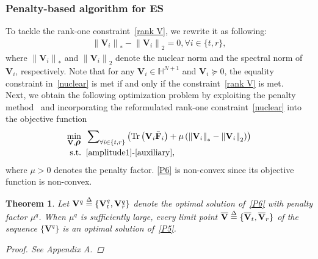 \documentclass[12pt, draftclsnofoot, onecolumn]{IEEEtran}
\DeclareMathOperator{\tr}{Tr}
\newcommand{\bm}[1]{\mbox{\boldmath{$#1$}}}
\newtheorem{theorem}{Theorem}
\begin{document}
\subsubsection{Penalty-based algorithm for ES}
To tackle the rank-one constraint~\eqref{rank V}, we rewrite it as following:
\begin{equation}\label{nuclear}
\begin{aligned}
\left\|{\mathbf{V}}_i\right\|_*-\left\|{\mathbf{V}}_i\right\|_2=0, \forall i\in\{t,r\},
\end{aligned}
\end{equation}
where $\left\|{\mathbf{V}}_i\right\|_*$ and $\left\|{\mathbf{V}}_i\right\|_2$ denote the nuclear norm and the spectral norm of ${\mathbf{V}}_i$, respectively. Note that for any ${\mathbf{V}}_i\in\mathbb{H}^{N+1}$ and ${\mathbf{V}}_i \succeq 0$, the equality constraint in~\eqref{nuclear} is met if and only if the constraint~\eqref{rank V} is met.\\
\indent Next, we obtain the following optimization problem by exploiting the penalty method~\cite{ben1997penalty} and incorporating the reformulated rank-one constraint~\eqref{nuclear} into the objective function
\begin{subequations}\label{P6}
\begin{align}
\label{P6O} \mathop {\min }\limits_{ {{\mathbf{V}},{\bm{\rho}}} } \;\;&\sum\nolimits_{ \forall i \in \{t,r\}}\left(\tr\left({\mathbf{V}}_i\bar{\mathbf{F}}_i\right)+\mu\left(\left\|{\mathbf{V}}_i\right\|_*-\left\|{\mathbf{V}}_i\right\|_2\right)\right)\\[-0.1cm]
{\rm{s.t.}}\;\;& \eqref{amplitude1}\text{-}\eqref{auxiliary},
\end{align}
\end{subequations}
where $\mu>0$ denotes the penalty factor. \eqref{P6} is non-convex since its objective function is non-convex.
\begin{theorem}\label{theorem1}
Let ${\mathbf{V}}^q\buildrel \Delta \over =\{{\mathbf{V}}_t^q,{\mathbf{V}}_r^q\}$ denote the optimal solution of~\eqref{P6} with penalty factor $\mu^q$. When $\mu^q$ is sufficiently large, every limit point $\overline{\mathbf{V}}\buildrel \Delta \over=\{\overline{\mathbf{V}}_t, \overline{\mathbf{V}}_r\}$ of the sequence $\{{\mathbf{V}}^q\}$ is an optimal solution of~\eqref{P5}.
\begin{proof}
See Appendix A.
\end{proof}
\end{theorem}
\end{document}
